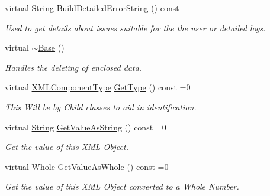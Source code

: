 \begin{DoxyCompactItemize}
virtual \hyperlink{namespacephys_aa03900411993de7fbfec4789bc1d392e}{String} \hyperlink{classphys_1_1xml_1_1Base_a08794e2e0e61e5f7e58a665025466891}{BuildDetailedErrorString} () const 
\begin{DoxyCompactList}\small\item\em Used to get details about issues suitable for the the user or detailed logs. \item\end{DoxyCompactList}\item 
\hypertarget{classphys_1_1xml_1_1Base_a5748d180a12bbef51a7b61dc3e814364}{
virtual \hyperlink{classphys_1_1xml_1_1Base_a5748d180a12bbef51a7b61dc3e814364}{$\sim$Base} ()}
\label{df/d10/classphys_1_1xml_1_1Base_a5748d180a12bbef51a7b61dc3e814364}

\begin{DoxyCompactList}\small\item\em Handles the deleting of enclosed data. \item\end{DoxyCompactList}\item 
virtual \hyperlink{classphys_1_1xml_1_1Base_a62ba0484b5ecb502f9ae9d82d3720320}{XMLComponentType} \hyperlink{classphys_1_1xml_1_1Base_a46d0361efc953e06f26c059658a9a070}{GetType} () const =0
\begin{DoxyCompactList}\small\item\em This Will be by Child classes to aid in identification. \item\end{DoxyCompactList}\item 
virtual \hyperlink{namespacephys_aa03900411993de7fbfec4789bc1d392e}{String} \hyperlink{classphys_1_1xml_1_1Base_aa9cd949b4d89d7ffa99412665e41a77e}{GetValueAsString} () const =0
\begin{DoxyCompactList}\small\item\em Get the value of this XML Object. \item\end{DoxyCompactList}\item 
virtual \hyperlink{namespacephys_a460f6bc24c8dd347b05e0366ae34f34a}{Whole} \hyperlink{classphys_1_1xml_1_1Base_ad12ac27b1bf14899b0034608c7782351}{GetValueAsWhole} () const =0
\begin{DoxyCompactList}\small\item\em Get the value of this XML Object converted to a Whole Number. \item\end{DoxyCompactList}\item 

\end{DoxyCompactItemize}
